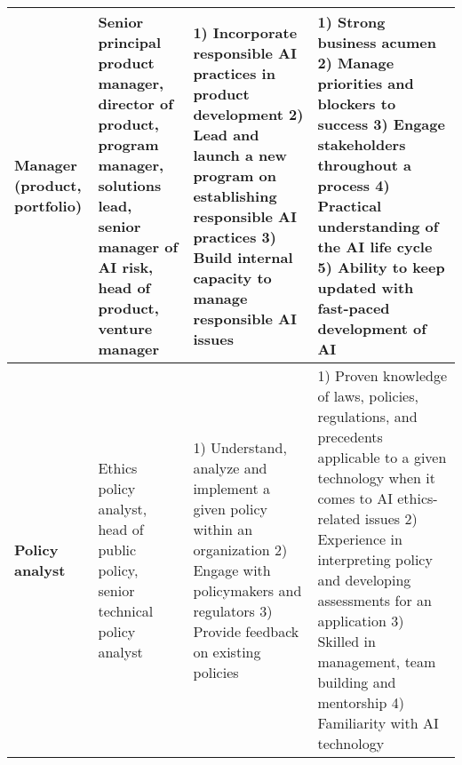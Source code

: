 \begin{table*}[]
{\begin{tabular}{p{}p{}p{}p{}}
\textbf{Manager (product, portfolio)}    & Senior   principal product manager, director of product, program manager, solutions   lead, senior manager of \ac{AI} risk, head of product, venture manager                                                                                            & 1) Incorporate responsible AI practices in product development 2) Lead and launch a new program on establishing responsible AI practices 3) Build internal capacity to manage responsible AI issues &
1) Strong business acumen 2) Manage priorities and blockers to success 3) Engage stakeholders throughout a process 4) Practical understanding of the AI life cycle 5) Ability to keep updated with fast-paced development of AI\\ \hline
\textbf{Policy analyst}                  & Ethics   policy analyst, head of public policy, senior technical policy analyst                                                                                                                                                                    & 1) Understand, analyze and implement a given policy within an organization 2) Engage with policymakers and regulators 3) Provide feedback on existing policies & 1) Proven knowledge of laws, policies, regulations, and precedents applicable to a given technology when it comes to AI ethics-related issues 2) Experience in interpreting policy and developing assessments for an application 3) Skilled in management, team building and mentorship 4) Familiarity with AI technology \\ \bottomrule
\end{tabular}}
\end{table*}



